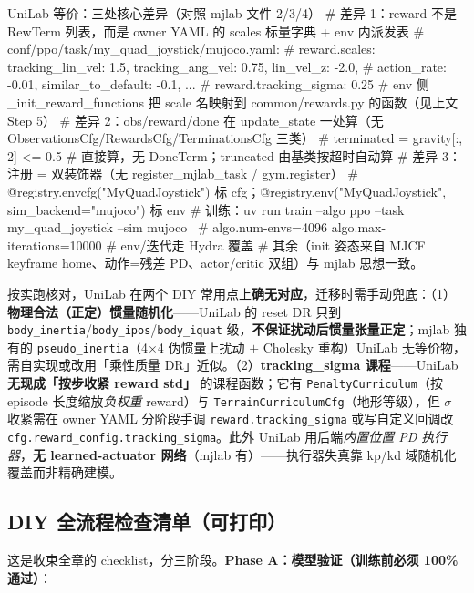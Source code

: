 \begin{codebox}[Python]{UniLab 等价：三处核心差异（对照 mjlab 文件 2/3/4）}
# 差异 1：reward 不是 RewTerm 列表，而是 owner YAML 的 scales 标量字典 + env 内派发表
#   conf/ppo/task/my_quad_joystick/mujoco.yaml:
#     reward.scales: {tracking_lin_vel: 1.5, tracking_ang_vel: 0.75, lin_vel_z: -2.0,
#                     action_rate: -0.01, similar_to_default: -0.1, ...}
#     reward.tracking_sigma: 0.25
#   env 侧 _init_reward_functions 把 scale 名映射到 common/rewards.py 的函数（见上文 Step 5）
# 差异 2：obs/reward/done 在 update_state 一处算（无 ObservationsCfg/RewardsCfg/TerminationsCfg 三类）
#   terminated = gravity[:, 2] <= 0.5            # 直接算，无 DoneTerm；truncated 由基类按超时自动算
# 差异 3：注册 = 双装饰器（无 register_mjlab_task / gym.register）
#   @registry.envcfg("MyQuadJoystick") 标 cfg；@registry.env("MyQuadJoystick", sim_backend="mujoco") 标 env
#   训练：uv run train --algo ppo --task my_quad_joystick --sim mujoco \
#         algo.num-envs=4096 algo.max-iterations=10000     # env/迭代走 Hydra 覆盖
# 其余（init 姿态来自 MJCF keyframe home、动作=残差 PD、actor/critic 双组）与 mjlab 思想一致。
\end{codebox}

\begin{note}
按实跑核对，UniLab 在两个 DIY 常用点上\textbf{确无对应}，迁移时需手动兜底：（1）\textbf{物理合法（正定）惯量随机化}——UniLab 的 reset DR 只到 \verb|body_inertia|/\verb|body_ipos|/\verb|body_iquat| 级，\textbf{不保证扰动后惯量张量正定}；mjlab 独有的 \verb|pseudo_inertia|（4$\times$4 伪惯量上扰动 $+$ Cholesky 重构）UniLab 无等价物，需自实现或改用「乘性质量 DR」近似。（2）\textbf{tracking\_sigma 课程}——UniLab \textbf{无现成「按步收紧 reward std」} 的课程函数；它有 \verb|PenaltyCurriculum|（按 episode 长度缩放\emph{负权重} reward）与 \verb|TerrainCurriculumCfg|（地形等级），但 $\sigma$ 收紧需在 owner YAML 分阶段手调 \verb|reward.tracking_sigma| 或写自定义回调改 \verb|cfg.reward_config.tracking_sigma|。此外 UniLab 用后端\emph{内置位置 PD 执行器}，\textbf{无 learned-actuator 网络}（mjlab 有）——执行器失真靠 kp/kd 域随机化覆盖而非精确建模。
\end{note}

\subsection{DIY 全流程检查清单（可打印）}
\label{sec:rlmc-diy-checklist}

这是收束全章的 checklist，分三阶段。\textbf{Phase A：模型验证（训练前必须 100\% 通过）}：

